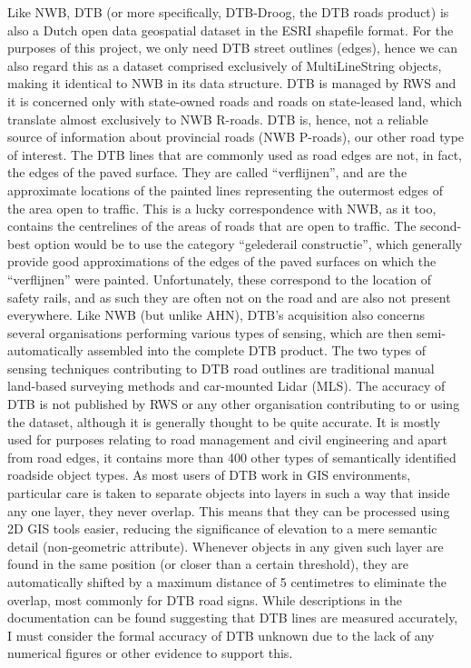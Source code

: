 Like NWB, DTB (or more specifically, DTB-Droog, the DTB roads product) is also a Dutch open data geospatial dataset in the ESRI shapefile format. For the purposes of this project, we only need DTB street outlines (edges), hence we can also regard this as a dataset comprised exclusively of MultiLineString objects, making it identical to NWB in its data structure. DTB is managed by RWS and it is concerned only with state-owned roads and roads on state-leased land, which translate almost exclusively to NWB R-roads. DTB is, hence, not a reliable source of information about provincial roads (NWB P-roads), our other road type of interest. The DTB lines that are commonly used as road edges are not, in fact, the edges of the paved surface. They are called “verflijnen”, and are the approximate locations of the painted lines representing the outermost edges of the area open to traffic. This is a lucky correspondence with NWB, as it too, contains the centrelines of the areas of roads that are open to traffic. The second-best option would be to use the category “gelederail constructie”, which generally provide good approximations of the edges of the paved surfaces on which the “verflijnen” were painted. Unfortunately, these correspond to the location of safety rails, and as such they are often not on the road and are also not present everywhere. Like NWB (but unlike AHN), DTB’s acquisition also concerns several organisations performing various types of sensing, which are then semi-automatically assembled into the complete DTB product. The two types of sensing techniques contributing to DTB road outlines are traditional manual land-based surveying methods and car-mounted Lidar (MLS). The accuracy of DTB is not published by RWS or any other organisation contributing to or using the dataset, although it is generally thought to be quite accurate. It is mostly used for purposes relating to road management and civil engineering and apart from road edges, it contains more than 400 other types of semantically identified roadside object types. As most users of DTB work in GIS environments, particular care is taken to separate objects into layers in such a way that inside any one layer, they never overlap. This means that they can be processed using 2D GIS tools easier, reducing the significance of elevation to a mere semantic detail (non-geometric attribute). Whenever objects in any given such layer are found in the same position (or closer than a certain threshold), they are automatically shifted by a maximum distance of 5 centimetres to eliminate the overlap, most commonly for DTB road signs. While descriptions in the documentation can be found suggesting that DTB lines are measured accurately, I must consider the formal accuracy of DTB unknown due to the lack of any numerical figures or other evidence to support this.

